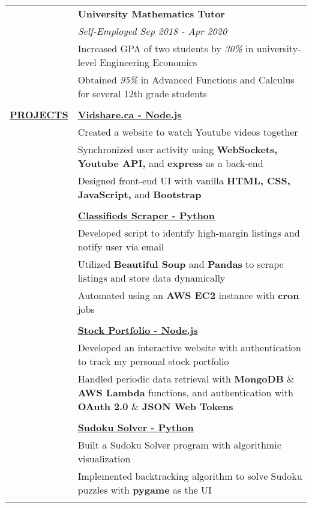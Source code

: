 \documentclass[letterpaper,11pt,oneside]{article}
\newcommand\tabitem{\makebox[1em][r]{-~~}} %
\newcommand\tabspace{\makebox[1em][r]{~~~}} %
\begin{document}
\begin{tabular}{@{}p{1.15in} p{6.08in}@{}}
     & \textbf{University Mathematics Tutor} \\
     & \textit{Self-Employed \hfill Sep 2018 - Apr 2020} \\
     & \tabitem Increased GPA of two students by \textit{30\%} in university-level Engineering Economics \\
     & \tabitem Obtained \textit{95\%} in Advanced Functions and Calculus for several 12th grade students \\
     & \\
     
  \textbf{\href{https://github.com/nathancheung22}{PROJECTS}} 
     & \textbf{\href{https://github.com/nathancheung22/vidshare}{Vidshare.ca - Node.js}} \\
     & \tabitem Created a website to watch Youtube videos together \\
     & \tabitem Synchronized user activity using \textbf{WebSockets, Youtube API,} and \textbf{express} as a back-end \\
     & \tabitem Designed front-end UI with vanilla \textbf{HTML, CSS, JavaScript,} and \textbf{Bootstrap} \\
     & \\
     
     & \textbf{\href{https://github.com/nathancheung22/classifieds-scraper}{Classifieds Scraper - Python}} \\
     & \tabitem Developed script to identify high-margin listings and notify user via email \\
     & \tabitem Utilized \textbf{Beautiful Soup} and \textbf{Pandas} to scrape listings and store data dynamically \\
     & \tabitem Automated using an \textbf{AWS EC2} instance with \textbf{cron} jobs \\
     & \\
     
     & \textbf{\href{https://determined-curie-4250bb.netlify.com/}{Stock Portfolio - Node.js}} \\
     & \tabitem Developed an interactive website with authentication to track my personal stock portfolio \\
     & \tabitem Handled periodic data retrieval with \textbf{MongoDB} \& \textbf{AWS Lambda} functions, and \tabspace authentication with \textbf{OAuth 2.0} \& \textbf{JSON Web Tokens} \\
     & \\
     
     &\textbf{\href{https://github.com/nathancheung22/Sudoku-Solver}{Sudoku Solver - Python}} \\
     & \tabitem Built a Sudoku Solver program with algorithmic visualization \\
     & \tabitem Implemented backtracking algorithm to solve Sudoku puzzles with \textbf{pygame} as the UI \\
     & \\


\end{tabular}
\end{document}
